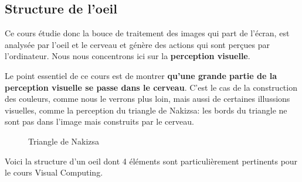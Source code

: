 \subsection{Structure de l'oeil}

Ce cours \'etudie donc la bouce de traitement des images qui part de l'\'ecran, est analys\'ee par l'oeil et le cerveau et g\'en\`ere des actions qui sont per\c{c}ues par l'ordinateur. Nous nous concentrons ici sur la \textbf{perception visuelle}.

Le point essentiel de ce cours est de montrer \textbf{qu'une grande partie de la perception visuelle se passe dans le cerveau}. C'est le cas de la construction des couleurs, comme nous le verrons plus loin, mais aussi de certaines illussions visuelles, comme la perception du triangle de Nakizsa: les bords du triangle ne sont pas dans l'image mais construits par le cerveau.

\begin{figure}[H]
\centering
{}
\caption{Triangle de Nakizsa}
\end{figure}

Voici la structure d'un oeil dont 4 \'el\'ements sont particuli\`erement pertinents pour le cours Visual Computing.

\begin{figure}[H]
\centering
{}
\end{figure}

